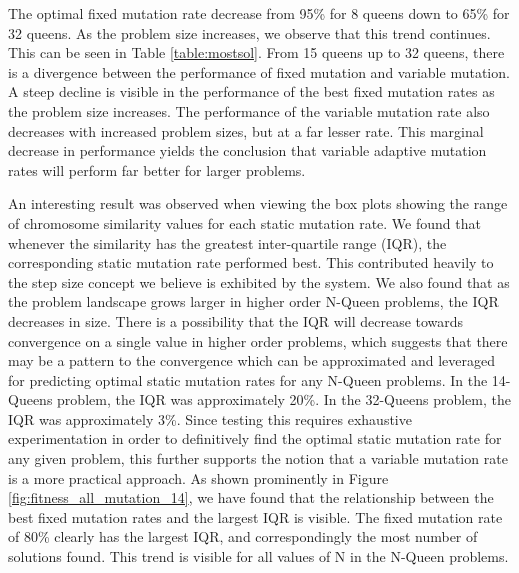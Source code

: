 \documentclass[conference]{IEEEtran}
\begin{document}
The optimal fixed mutation rate decrease from 95\% for 8 queens down to 65\% for 32 queens. As the problem size increases, we observe that this trend continues. This can be seen in Table \ref{table:mostsol}. From 15 queens up to 32 queens, there is a divergence between the performance of fixed mutation and variable mutation. A steep decline is visible in the performance of the best fixed mutation rates as the problem size increases. The performance of the variable mutation rate also decreases with increased problem sizes, but at a far lesser rate. This marginal decrease in performance yields the conclusion that variable adaptive mutation rates will perform far better for larger problems.

An interesting result was observed when viewing the box plots showing the range of chromosome similarity values for each static mutation rate. We found that whenever the similarity has the greatest inter-quartile range (IQR), the corresponding static mutation rate performed best. This contributed heavily to the step size concept we believe is exhibited by the system. We also found that as the problem landscape grows larger in higher order N-Queen problems, the IQR decreases in size. There is a possibility that the IQR will decrease towards convergence on a single value in higher order problems, which suggests that there may be a pattern to the convergence which can be approximated and leveraged for predicting optimal static mutation rates for any N-Queen problems. In the 14-Queens problem, the IQR was approximately 20\%. In the 32-Queens problem, the IQR was approximately 3\%. Since testing this requires exhaustive experimentation in order to definitively find the optimal static mutation rate for any given problem, this further supports the notion that a variable mutation rate is a more practical approach. As shown prominently in Figure \ref{fig:fitness_all_mutation_14}, we have found that the relationship between the best fixed mutation rates and the largest IQR is visible. The fixed mutation rate of 80\% clearly has the largest IQR, and correspondingly the most number of solutions found. This trend is visible for all values of N in the N-Queen problems. 
\end{document}
